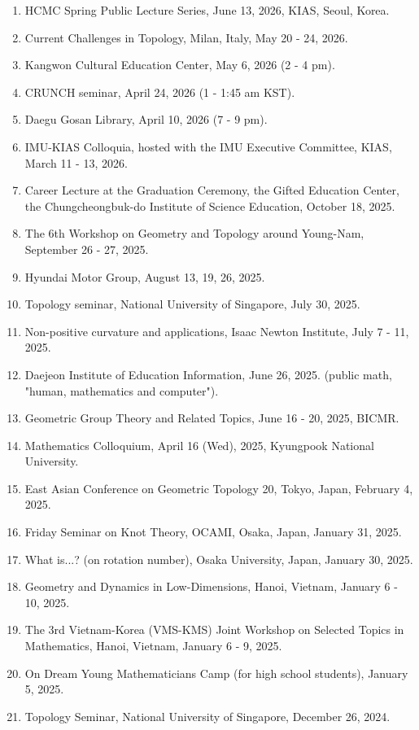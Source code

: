 \documentclass[11pt,a4paper]{article}
\begin{document}
\begin{enumerate}[leftmargin=1.5em, label=\arabic*.]
\item HCMC Spring Public Lecture Series, June 13, 2026, KIAS, Seoul, Korea.
\item Current Challenges in Topology, Milan, Italy, May 20 - 24, 2026.
\item Kangwon Cultural Education Center, May 6, 2026 (2 - 4 pm).
\item CRUNCH seminar, April 24, 2026 (1 - 1:45 am KST).
\item Daegu Gosan Library, April 10, 2026 (7 - 9 pm).
\item IMU-KIAS Colloquia, hosted with the IMU Executive Committee, KIAS, March 11 - 13, 2026.
\item Career Lecture at the Graduation Ceremony, the Gifted Education Center, the Chungcheongbuk-do Institute of Science Education, October 18, 2025.
\item The 6th Workshop on Geometry and Topology around Young-Nam, September 26 - 27, 2025.
\item Hyundai Motor Group, August 13, 19, 26, 2025.
\item Topology seminar, National University of Singapore, July 30, 2025.
\item Non-positive curvature and applications, Isaac Newton Institute, July 7 - 11, 2025.
\item Daejeon Institute of Education Information, June 26, 2025. (public math, "human, mathematics and computer").
\item Geometric Group Theory and Related Topics, June 16 - 20, 2025, BICMR.
\item Mathematics Colloquium, April 16 (Wed), 2025, Kyungpook National University.
\item East Asian Conference on Geometric Topology 20, Tokyo, Japan, February 4, 2025.
\item Friday Seminar on Knot Theory, OCAMI, Osaka, Japan, January 31, 2025.
\item What is...? (on rotation number), Osaka University, Japan, January 30, 2025.
\item Geometry and Dynamics in Low-Dimensions, Hanoi, Vietnam, January 6 - 10, 2025.
\item The 3rd Vietnam-Korea (VMS-KMS) Joint Workshop on Selected Topics in Mathematics, Hanoi, Vietnam, January 6 - 9, 2025.
\item On Dream Young Mathematicians Camp (for high school students), January 5, 2025.
\item Topology Seminar, National University of Singapore, December 26, 2024.

\end{enumerate}
\end{document}
